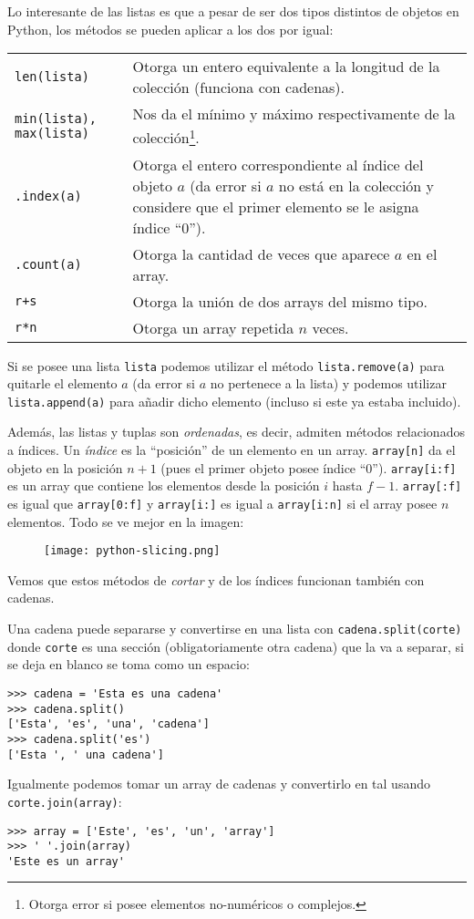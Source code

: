 \documentclass[11pt,twoside]{report}
\begin{document}
Lo interesante de las listas es que a pesar de ser dos tipos distintos de objetos en Python, los métodos se pueden aplicar a los dos por igual:
\begin{longtable}{lp{8cm}}
\lstinline|len(lista)| & Otorga un entero equivalente a la longitud de la colección (funciona con cadenas).\\
\lstinline|min(lista), max(lista)| & Nos da el mínimo y máximo respectivamente de la colección\footnote{Otorga error si posee elementos no-numéricos o complejos.}.\\
\lstinline|.index(a)| & Otorga el entero correspondiente al índice del objeto $a$ (da error si $a$ no está en la colección y considere que el primer elemento se le asigna índice ``0'').\\
\lstinline|.count(a)| & Otorga la cantidad de veces que aparece $a$ en el array.\\
\lstinline|r+s| & Otorga la unión de dos arrays del mismo tipo.\\
\lstinline|r*n| & Otorga un array repetida $n$ veces.
\end{longtable}
Si se posee una lista \lstinline|lista| podemos utilizar el método \lstinline|lista.remove(a)| para quitarle el elemento $a$ (da error si $a$ no pertenece a la lista) y podemos utilizar \lstinline|lista.append(a)| para añadir dicho elemento (incluso si este ya estaba incluido).

Además, las listas y tuplas son \textit{ordenadas}, es decir, admiten métodos relacionados a índices. Un \textit{índice} es la ``posición'' de un elemento en un array. \lstinline|array[n]| da el objeto en la posición $n+1$ (pues el primer objeto posee índice ``0''). \lstinline|array[i:f]| es un array que contiene los elementos desde la posición $i$ hasta $f-1$. \lstinline|array[:f]| es igual que \lstinline|array[0:f]| y \lstinline|array[i:]| es igual a \lstinline|array[i:n]| si el array posee $n$ elementos. Todo se ve mejor en la imagen:
\begin{figure}
\centering
\texttt{[image: python-slicing.png]}
\caption{}
\end{figure}

Vemos que estos métodos de \textit{cortar} y de los índices funcionan también con cadenas.

Una cadena puede separarse y convertirse en una lista con \lstinline|cadena.split(corte)| donde \lstinline|corte| es una sección (obligatoriamente otra cadena) que la va a separar, si se deja en blanco se toma como un espacio:
\begin{lstlisting}
>>> cadena = 'Esta es una cadena'
>>> cadena.split()
['Esta', 'es', 'una', 'cadena']
>>> cadena.split('es')
['Esta ', ' una cadena']
\end{lstlisting}
Igualmente podemos tomar un array de cadenas y convertirlo en tal usando \lstinline|corte.join(array)|:
\begin{lstlisting}
>>> array = ['Este', 'es', 'un', 'array']
>>> ' '.join(array)
'Este es un array'
\end{lstlisting}
\end{document}
